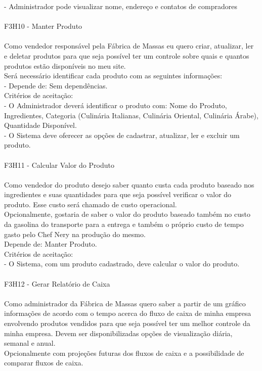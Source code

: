 \tab - Administrador pode visualizar nome, endereço e contatos de compradores\\
\\
F3H10 - Manter Produto\\
\\
\tab Como vendedor responsável pela Fábrica de Massas eu quero criar, atualizar, ler e deletar produtos para que seja possível ter um controle sobre quais e quantos produtos estão disponíveis no meu site.\\
\tab Será necessário identificar cada produto com as seguintes informações:\\
\tab - Depende de: Sem dependências.\\
\tab Critérios de aceitação:\\
\tab - O Administrador deverá identificar o produto com: Nome do Produto, Ingredientes, Categoria (Culinária Italianas, Culinária Oriental, Culinária Árabe), Quantidade Disponível.\\
\tab - O Sistema deve oferecer as opções de cadastrar, atualizar, ler e excluir um produto.\\
\\
F3H11 - Calcular Valor do Produto\\
\\
\tab Como vendedor do produto desejo saber quanto custa cada produto baseado nos ingredientes e suas quantidades para que seja possível verificar o valor do produto. Esse custo será chamado de custo operacional.\\
\tab Opcionalmente, gostaria de saber o valor do produto baseado também no custo da gasolina do transporte para a entrega e também o próprio custo de tempo gasto pelo Chef Nery na produção do mesmo.\\
\tab Depende de: Manter Produto.\\
\tab Critérios de aceitação:\\
\tab - O Sistema, com um produto cadastrado, deve calcular o valor do produto.\\
\\
F3H12 - Gerar Relatório de Caixa\\
\\
\tab Como administrador da Fábrica de Massas quero saber a partir de um gráfico informações de acordo com o tempo acerca do fluxo de caixa de minha empresa envolvendo produtos vendidos para que seja possível ter um melhor controle da minha empresa. Devem ser disponibilizadas opções de visualização diária, semanal e anual.\\
\tab Opcionalmente com projeções futuras dos fluxos de caixa e a possibilidade de comparar fluxos de caixa.\\
